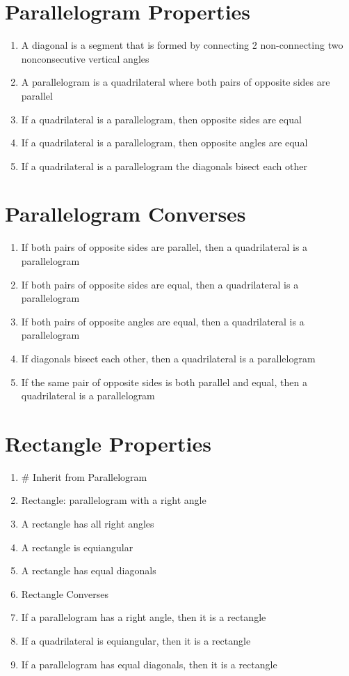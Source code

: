 \section*{Parallelogram Properties}
\begin{enumerate}
    \item A diagonal is a segment that is formed by connecting 2 non-connecting two nonconsecutive vertical angles
    \item A parallelogram is a quadrilateral where both pairs of opposite sides are parallel
    \item If a quadrilateral is a parallelogram, then opposite sides are equal
    \item If a quadrilateral is a parallelogram, then opposite angles are equal
    \item If a quadrilateral is a parallelogram the diagonals bisect each other
\end{enumerate}

\section*{Parallelogram Converses}
\begin{enumerate}
    \item If both pairs of opposite sides are parallel, then a quadrilateral is a parallelogram
    \item If both pairs of opposite sides are equal, then a quadrilateral is a parallelogram
    \item If both pairs of opposite angles are equal, then a quadrilateral is a parallelogram
    \item If diagonals bisect each other, then a quadrilateral is a parallelogram
    \item If the same pair of opposite sides is both parallel and equal, then a quadrilateral is a parallelogram
\end{enumerate}

\section*{Rectangle Properties}
\begin{enumerate}
    \item \# Inherit from Parallelogram
    \item Rectangle: parallelogram with a right angle
    \item A rectangle has all right angles
    \item A rectangle is equiangular
    \item A rectangle has equal diagonals
    \item Rectangle Converses
    \item If a parallelogram has a right angle, then it is a rectangle
    \item If a quadrilateral is equiangular, then it is a rectangle
    \item If a parallelogram has equal diagonals, then it is a rectangle
\end{enumerate}


